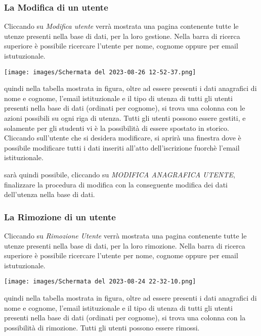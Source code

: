 \documentclass{article}
\begin{document}
    \pagebreak

    \subsubsection{La Modifica di un utente}
    Cliccando su \textit{Modifica utente} verrà mostrata una pagina contenente tutte le utenze presenti nella base di dati, per la loro gestione. Nella barra di ricerca superiore è possibile ricercare l'utente per nome, cognome oppure per email istutuzionale.

    \begin{center}
        \texttt{[image: images/Schermata del 2023-08-26 12-52-37.png]}
    \end{center}

    quindi nella tabella mostrata in figura, oltre ad essere presenti i dati anagrafici di nome e cognome, l'email istituzionale e il tipo di utenza di tutti gli utenti presenti nella base di dati (ordinati per cognome), si trova una colonna con le azioni possibili su ogni riga di utenza. Tutti gli utenti possono essere gestiti, e solamente per gli studenti vi è la possibilità di essere spostato in storico.
    Cliccando sull'utente che si desidera modificare, si aprirà una finestra dove è possibile modificare tutti i dati inseriti all'atto dell'iscrizione fuorchè l'email istituzionale.

    sarà quindi possibile, cliccando su \textit{MODIFICA ANAGRAFICA UTENTE}, finalizzare la procedura di modifica con la conseguente modifica dei dati dell'utenza nella base di dati.

    \pagebreak

    \subsubsection{La Rimozione di un utente}
    Cliccando su \textit{Rimozione Utente} verrà mostrata una pagina contenente tutte le utenze presenti nella base di dati, per la loro rimozione. Nella barra di ricerca superiore è possibile ricercare l'utente per nome, cognome oppure per email istutuzionale.

    \begin{center}
        \texttt{[image: images/Schermata del 2023-08-24 22-32-10.png]}
    \end{center}

    quindi nella tabella mostrata in figura, oltre ad essere presenti i dati anagrafici di nome e cognome, l'email istituzionale e il tipo di utenza di tutti gli utenti presenti nella base di dati (ordinati per cognome), si trova una colonna con la possibilità di rimozione. Tutti gli utenti possono essere rimossi.
\end{document}
